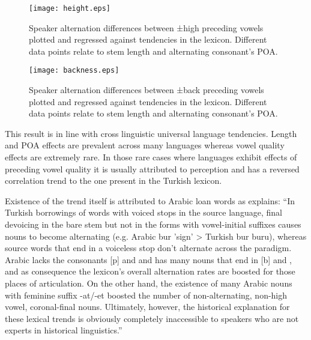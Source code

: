 \documentclass[a4paper,12pt]{article}
\begin{document}
\begin{figure}[!ht]
\centering
\begin{minipage}[b]{0.45\textwidth}
\centering
\texttt{[image: height.eps]}
\captionsetup{font=tiny}
\caption{Speaker alternation differences between ±high preceding vowels plotted and regressed
against tendencies in the lexicon. Different data points relate to stem length and alternating
consonant's POA.}
\label{fig:height}
\end{minipage}\hfill
\begin{minipage}[b]{0.45\textwidth}
\centering
\texttt{[image: backness.eps]}
\captionsetup{font=tiny}
\caption{Speaker alternation differences between ±back preceding vowels plotted and regressed
against tendencies in the lexicon. Different data points relate to stem length and alternating
consonant's POA.}
\label{fig:backness}
\end{minipage}
\end{figure}

This result is in line with cross linguistic universal language tendencies. Length and POA effects
are prevalent across many languages whereas vowel quality effects are extremely rare. In those rare
cases where languages exhibit effects of preceding vowel quality it is usually attributed to
perception and has a reversed correlation trend to the one present in the Turkish lexicon.

Existence of the trend itself is attributed to Arabic loan words as \cite{becker_phonological_2009}
explains: ``In Turkish borrowings of words with voiced stops in the source language, final
devoicing in the bare stem but not in the forms with vowel-initial suffixes causes nouns to become
alternating (e.g. Arabic bur 'sign' > Turkish bur buru),
whereas source words that end in a voiceless stop don't alternate across the paradigm. Arabic lacks
the consonants [p] and \textipa{[\t{tS}]} and has many nouns that end in [b] and \textipa{[\t{dZ}]},
and as consequence the lexicon’s overall alternation rates are boosted for those places of
articulation. On the other hand, the existence of many Arabic nouns with feminine suffix -at/-et
boosted the number of non-alternating, non-high vowel, coronal-final nouns. Ultimately, however, the historical
explanation for these lexical trends is obviously completely inaccessible to speakers who are not
experts in historical linguistics.''
\end{document}
